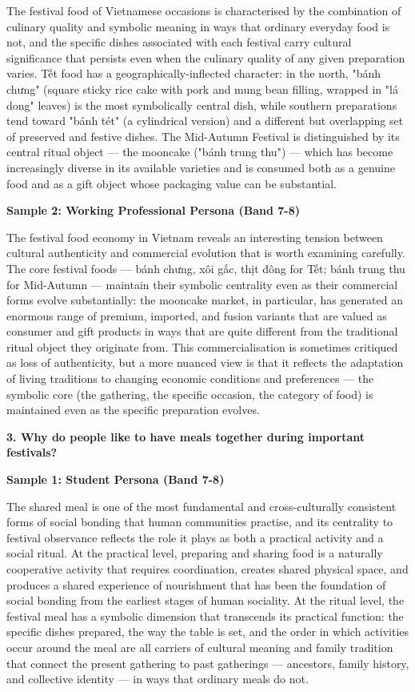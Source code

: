 The festival food of Vietnamese occasions is characterised by the combination of culinary quality and symbolic meaning in ways that ordinary everyday food is not, and the specific dishes associated with each festival carry cultural significance that persists even when the culinary quality of any given preparation varies. Tết food has a geographically-inflected character: in the north, "bánh chưng" (square sticky rice cake with pork and mung bean filling, wrapped in "lá dong" leaves) is the most symbolically central dish, while southern preparations tend toward "bánh tét" (a cylindrical version) and a different but overlapping set of preserved and festive dishes. The Mid-Autumn Festival is distinguished by its central ritual object — the mooncake ("bánh trung thu") — which has become increasingly diverse in its available varieties and is consumed both as a genuine food and as a gift object whose packaging value can be substantial.

\textbf{Sample 2: Working Professional Persona (Band 7-8)}

The festival food economy in Vietnam reveals an interesting tension between cultural authenticity and commercial evolution that is worth examining carefully. The core festival foods — bánh chưng, xôi gấc, thịt đông for Tết; bánh trung thu for Mid-Autumn — maintain their symbolic centrality even as their commercial forms evolve substantially: the mooncake market, in particular, has generated an enormous range of premium, imported, and fusion variants that are valued as consumer and gift products in ways that are quite different from the traditional ritual object they originate from. This commercialisation is sometimes critiqued as loss of authenticity, but a more nuanced view is that it reflects the adaptation of living traditions to changing economic conditions and preferences — the symbolic core (the gathering, the specific occasion, the category of food) is maintained even as the specific preparation evolves.

\separator

\begin{ieltsquestion}
\textbf{3. Why do people like to have meals together during important festivals?}
\end{ieltsquestion}
\textbf{Sample 1: Student Persona (Band 7-8)}

The shared meal is one of the most fundamental and cross-culturally consistent forms of social bonding that human communities practise, and its centrality to festival observance reflects the role it plays as both a practical activity and a social ritual. At the practical level, preparing and sharing food is a naturally cooperative activity that requires coordination, creates shared physical space, and produces a shared experience of nourishment that has been the foundation of social bonding from the earliest stages of human sociality. At the ritual level, the festival meal has a symbolic dimension that transcends its practical function: the specific dishes prepared, the way the table is set, and the order in which activities occur around the meal are all carriers of cultural meaning and family tradition that connect the present gathering to past gatherings — ancestors, family history, and collective identity — in ways that ordinary meals do not.

